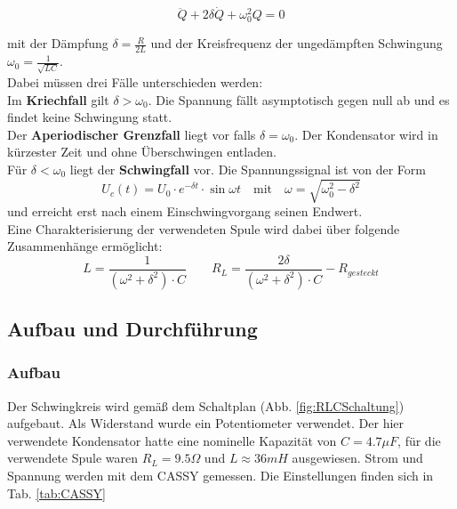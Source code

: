 \documentclass[12pt,a4paper]{article}
\begin{document}
\begin{equation}
\ddot{Q}+2\delta \dot{Q}+\omega_0^2 Q=0
\end{equation}

mit der Dämpfung $\delta=\frac{R}{2L}$ und der Kreisfrequenz der ungedämpften Schwingung $\omega_0=\frac{1}{\sqrt{LC}}$.\\
Dabei müssen drei Fälle unterschieden werden:\\
Im \textbf{Kriechfall} gilt $\delta > \omega_0$. Die Spannung fällt asymptotisch gegen null ab und es findet keine Schwingung statt.\\
Der \textbf{Aperiodischer Grenzfall} liegt vor falls $\delta=\omega_0$. Der Kondensator wird in kürzester Zeit und ohne Überschwingen entladen.\\
Für $\delta<\omega_0$ liegt der \textbf{Schwingfall} vor. Die Spannungssignal ist von der Form 
\begin{equation}
U_c(t)=U_0 \cdot e^{-\delta t} \cdot \sin{\omega t} \quad \text{mit} \quad \omega=\sqrt{\omega_0^2-\delta^2}
\end{equation}
und erreicht erst nach einem Einschwingvorgang seinen Endwert.\\

Eine Charakterisierung der verwendeten Spule wird dabei über folgende Zusammenhänge ermöglicht:
\begin{equation}
L=\frac{1}{(\omega^2+\delta^2)\cdot C} \qquad  R_L=\frac{2\delta}{(\omega^2+\delta^2)\cdot C}-R_{gesteckt}
\end{equation}

\subsection{Aufbau und Durchführung}
\subsubsection{Aufbau}

Der Schwingkreis wird gemäß dem Schaltplan (Abb. \ref{fig:RLCSchaltung}) aufgebaut. Als Widerstand wurde ein Potentiometer verwendet. Der hier verwendete Kondensator hatte eine nominelle Kapazität von $C=4.7 \mu F$, für die verwendete Spule waren $R_L=9.5 \Omega$ und $L \approx 36mH$ ausgewiesen. Strom und Spannung werden mit dem CASSY gemessen. Die Einstellungen finden sich in Tab. \ref{tab:CASSY}
\end{document}
